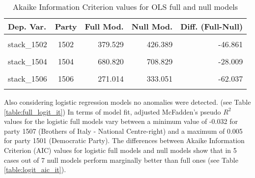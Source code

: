 \documentclass[
]{article}
\begin{document}
\begin{table}[!h]

\caption{\label{tab:unnamed-chunk-97}Akaike Information Criterion values for OLS full and null models 
        \label{table:ols_aic_it}}
\centering
\begin{tabular}[t]{lcrrr}
\toprule
Dep. Var. & Party & Full Mod. & Null Mod. & Diff. (Full-Null)\\
\midrule
\cellcolor{gray!6}{stack\_1501} & \cellcolor{gray!6}{1501} & \cellcolor{gray!6}{604.084} & \cellcolor{gray!6}{635.702} & \cellcolor{gray!6}{-31.618}\\
stack\_1502 & 1502 & 379.529 & 426.389 & -46.861\\
\cellcolor{gray!6}{stack\_1503} & \cellcolor{gray!6}{1503} & \cellcolor{gray!6}{875.306} & \cellcolor{gray!6}{890.751} & \cellcolor{gray!6}{-15.445}\\
stack\_1504 & 1504 & 680.820 & 708.829 & -28.009\\
\cellcolor{gray!6}{stack\_1505} & \cellcolor{gray!6}{1505} & \cellcolor{gray!6}{208.266} & \cellcolor{gray!6}{268.839} & \cellcolor{gray!6}{-60.573}\\
\addlinespace
stack\_1506 & 1506 & 271.014 & 333.051 & -62.037\\
\cellcolor{gray!6}{stack\_1507} & \cellcolor{gray!6}{1507} & \cellcolor{gray!6}{539.212} & \cellcolor{gray!6}{552.821} & \cellcolor{gray!6}{-13.609}\\
\bottomrule
\end{tabular}
\end{table}

Also considering logistic regression models no anomalies were detected. (see Table
\ref{table:full_logit_it}) In terms of model fit, adjusted McFadden's pseudo \(R^2\) values for the
logistic full models vary between a minimum value of
-0.032
for party 1507
(Brothers of Italy - National Centre-right)
and a maximum of
0.005
for party 1501
(Democratic Party).
The differences between Akaike Information Criterion (AIC) values for logistic full models and
null models show that in 5 cases out of 7 null models perform marginally better than full ones (see
Table \ref{table:logit_aic_it}).
\end{document}
